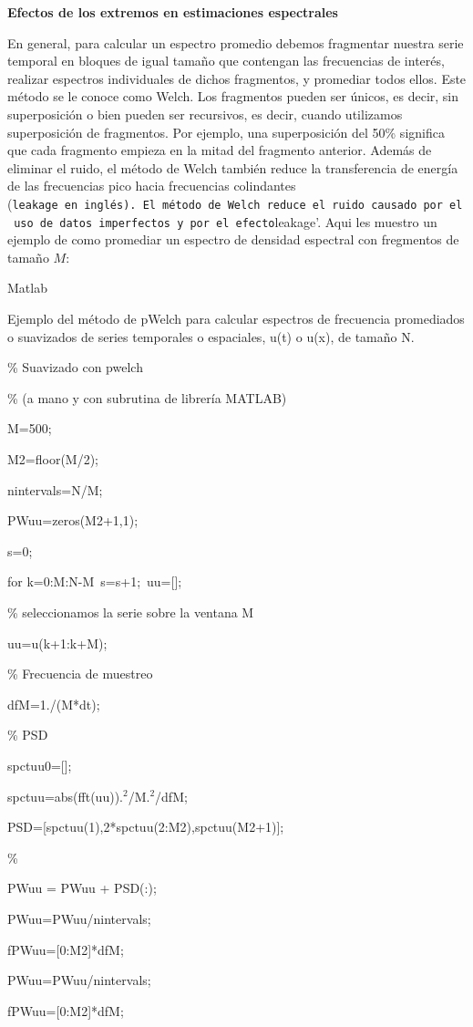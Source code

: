 \documentclass[
]{agujournal2019}
\begin{document}
\vspace{0.5cm}

\textbf{Efectos de los extremos en estimaciones espectrales}

En general, para calcular un espectro promedio debemos fragmentar
nuestra serie temporal en bloques de igual tamaño que contengan las
frecuencias de interés, realizar espectros individuales de dichos
fragmentos, y promediar todos ellos. Este método se le conoce como
Welch. Los fragmentos pueden ser únicos, es decir, sin superposición o
bien pueden ser recursivos, es decir, cuando utilizamos superposición de
fragmentos. Por ejemplo, una superposición del 50\% significa que cada
fragmento empieza en la mitad del fragmento anterior. Además de eliminar
el ruido, el método de Welch también reduce la transferencia de energía
de las frecuencias pico hacia frecuencias colindantes
(\texttt{leakage\textquotesingle{}\ en\ inglés).\ El\ método\ de\ Welch\ reduce\ el\ ruido\ causado\ por\ el\ uso\ de\ datos\ imperfectos\ y\ por\ el\ efecto}leakage'.
Aqui les muestro un ejemplo de como promediar un espectro de densidad
espectral con fregmentos de tamaño \(M\):

\begin{framed}

\noindent Matlab

Ejemplo del método de pWelch para calcular espectros
de frecuencia promediados o suavizados de series temporales
o espaciales, u(t) o u(x), de tamaño N.

\% Suavizado con pwelch 

\% (a mano y con subrutina de librería MATLAB)

M=500;\

M2=floor(M/2);\

nintervals=N/M;\

PWuu=zeros(M2+1,1);\

s=0;\

for k=0:M:N-M\
      s=s+1;\
      uu=[];\

\% seleccionamos la serie sobre la ventana M\
      
      uu=u(k+1:k+M);\

\% Frecuencia de muestreo\
      
      dfM=1./(M*dt);\

\% PSD

    spctuu0=[];\

spctuu=abs(fft(uu)).$^2$/M.$^2$/dfM;

     PSD=[spctuu(1),2*spctuu(2:M2),spctuu(M2+1)];\

\%

      PWuu = PWuu + PSD(:);\

      PWuu=PWuu/nintervals;\

      fPWuu=[0:M2]*dfM;\

      PWuu=PWuu/nintervals;\

      fPWuu=[0:M2]*dfM;\

\end{framed}
\end{document}
